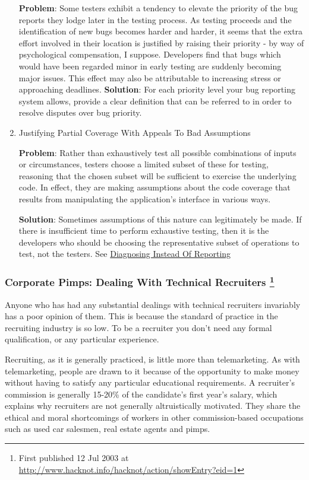 \documentclass{article}
\begin{document}
\begin{enumerate}
\textbf{Problem}: Some testers exhibit a tendency to elevate the priority of
the bug reports they lodge later in the testing process. As testing
proceeds and the identification of new bugs becomes harder and harder,
it seems that the extra effort involved in their location is justified
by raising their priority - by way of psychological compensation, I
suppose. Developers find that bugs which would have been regarded minor
in early testing are suddenly becoming major issues. This effect may
also be attributable to increasing stress or approaching deadlines.
\textbf{Solution}: For each priority level your bug reporting system allows,
provide a clear definition that can be referred to in order to resolve
disputes over bug priority.

\item Justifying Partial Coverage With Appeals To Bad Assumptions
\label{sec:orgheadline101}

\textbf{Problem}: Rather than exhaustively test all possible combinations of
inputs or circumstances, testers choose a limited subset of these for
testing, reasoning that the chosen subset will be sufficient to exercise
the underlying code. In effect, they are making assumptions about the
code coverage that results from manipulating the application's interface
in various ways.

\textbf{Solution}: Sometimes assumptions of this nature can legitimately be
made. If there is insufficient time to perform exhaustive testing, then
it is the developers who should be choosing the representative subset of
operations to test, not the testers. See \hyperref[sec:orgheadline94]{Diagnosing Instead Of Reporting}
\end{enumerate}

\subsubsection{Corporate Pimps: Dealing With Technical Recruiters  \footnote{First published 12 Jul 2003 at
\url{http://www.hacknot.info/hacknot/action/showEntry?eid=1}}}
\label{sec:orgheadline124}

Anyone who has had any substantial dealings with technical recruiters
invariably has a poor opinion of them. This is because the standard of
practice in the recruiting industry is so low. To be a recruiter you
don't need any formal qualification, or any particular experience.

Recruiting, as it is generally practiced, is little more than
telemarketing. As with telemarketing, people are drawn to it because of
the opportunity to make money without having to satisfy any particular
educational requirements. A recruiter's commission is generally 15-20\%
of the candidate's first year's salary, which explains why recruiters
are not generally altruistically motivated. They share the ethical and
moral shortcomings of workers in other commission-based occupations such
as used car salesmen, real estate agents and pimps.
\end{document}
